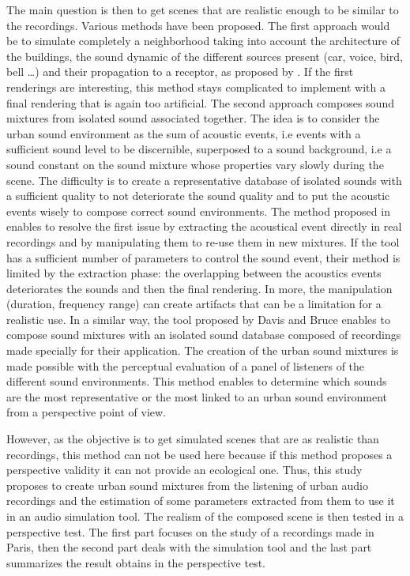 \documentclass[a4,11pt,twocolumn]{article}
\begin{document}
The main question is then to get scenes that are realistic enough to be similar to the recordings. Various methods have been proposed. The first approach would be to simulate completely a neighborhood taking into account the architecture of the buildings, the sound dynamic of the different sources present (car, voice, bird, bell \dots) and their propagation to a receptor, as proposed by \cite{cstb_simulation_2015}. If the first renderings are interesting, this method stays complicated to implement with a final rendering that is again too artificial. 
The second approach composes sound mixtures from isolated sound associated together. The idea is to consider the urban sound environment as the sum of acoustic events, i.e events with a sufficient sound level to be discernible, superposed to a sound background, i.e a sound constant on the sound mixture whose properties vary slowly during the scene. The difficulty is to create a representative database of isolated sounds with a sufficient quality to not deteriorate the sound quality and to put the acoustic events wisely to compose correct sound environments. The method proposed in \cite{misra_musical_2007} enables to resolve the first issue by extracting the acoustical event directly in real recordings and by manipulating them to re-use them in new mixtures. If the tool has a sufficient number of parameters to control the sound event, their method is limited by the extraction phase: the overlapping between the acoustics events deteriorates the sounds and then the final rendering. In more, the manipulation (duration, frequency range) can create artifacts that can be a limitation for a realistic use. In a similar way, the tool proposed by Davis and Bruce \cite{bruce_development_2009} enables to compose sound mixtures with an isolated sound database composed of recordings made specially for their application. The creation of the urban sound mixtures is made possible with the perceptual evaluation of a panel of listeners of the different sound environments. This method enables to determine which sounds are the most representative or the most linked to an urban sound environment from a perspective point of view. 

However, as the objective is to get simulated scenes that are as realistic than recordings, this method can not be used here because if this method proposes a perspective validity it can not provide an ecological one. Thus, this study proposes to create urban sound mixtures from the listening of urban audio recordings and the estimation of some parameters extracted from them to use it in an audio simulation tool. The realism of the composed scene is then tested in a perspective test. The first part focuses on the study of a recordings made in Paris, then the second part deals with the simulation tool and the last part summarizes the result obtains in the perspective test. 
\end{document}
